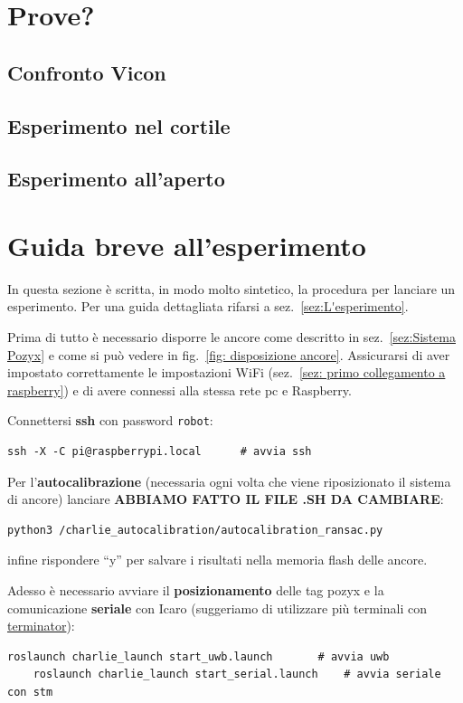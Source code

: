 \section{Prove?}
\subsection{Confronto Vicon}

\subsection{Esperimento nel cortile}

\subsection{Esperimento all'aperto}



\newpage
\section{Guida breve all'esperimento}
In questa sezione \`e scritta, in modo molto sintetico, la procedura per lanciare un esperimento. Per una guida dettagliata rifarsi a sez.~\ref{sez:L'esperimento}. 

Prima di tutto \`e necessario disporre le ancore come descritto in sez.~\ref{sez:Sistema Pozyx} e come si pu\`o vedere in fig.~\ref{fig: disposizione ancore}. Assicurarsi di aver impostato correttamente le impostazioni WiFi (sez.~\ref{sez: primo collegamento a raspberry}) e di avere connessi alla stessa rete pc e Raspberry.


Connettersi \textbf{ssh} con password \texttt{robot}:
\begin{lstlisting}[style=bash]
	ssh -X -C pi@raspberrypi.local		# avvia ssh
\end{lstlisting}

Per l'\textbf{autocalibrazione} (necessaria ogni volta che viene riposizionato il sistema di ancore) lanciare \textbf{ABBIAMO FATTO IL FILE .SH DA CAMBIARE}:
\begin{lstlisting}[style=bash]
	python3 /charlie_autocalibration/autocalibration_ransac.py
\end{lstlisting}
infine rispondere ``y'' per salvare i risultati nella memoria flash delle ancore.

Adesso \`e necessario avviare il \textbf{posizionamento} delle tag pozyx e la comunicazione \textbf{seriale} con Icaro (suggeriamo di utilizzare pi\`u terminali con \href{https://terminator-gtk3.readthedocs.io/en/latest/}{terminator}):
\begin{lstlisting}[style=bash]
	roslaunch charlie_launch start_uwb.launch		# avvia uwb
	roslaunch charlie_launch start_serial.launch	# avvia seriale con stm
\end{lstlisting}

